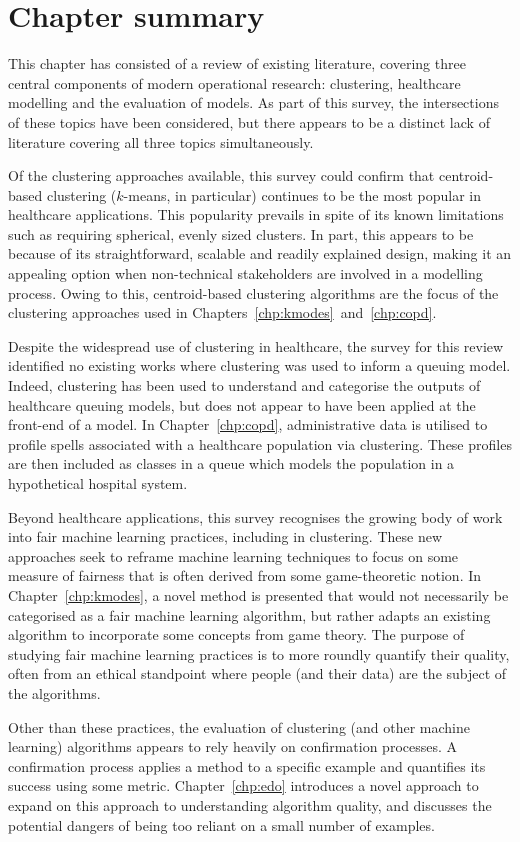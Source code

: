 \section{Chapter summary}

This chapter has consisted of a review of existing literature, covering three
central components of modern operational research: clustering, healthcare
modelling and the evaluation of models. As part of this survey, the
intersections of these topics have been considered, but there appears to be a
distinct lack of literature covering all three topics simultaneously.

Of the clustering approaches available, this survey could confirm that
centroid-based clustering (\(k\)-means, in particular) continues to be the most
popular in healthcare applications. This popularity prevails in spite of its
known limitations such as requiring spherical, evenly sized clusters. In part,
this appears to be because of its straightforward, scalable and readily
explained design, making it an appealing option when non-technical stakeholders
are involved in a modelling process. Owing to this, centroid-based clustering
algorithms are the focus of the clustering approaches used in
Chapters~\ref{chp:kmodes}~and~\ref{chp:copd}.

Despite the widespread use of clustering in healthcare, the survey for this
review identified no existing works where clustering was used to inform a
queuing model. Indeed, clustering has been used to understand and categorise the
outputs of healthcare queuing models, but does not appear to have been applied
at the front-end of a model. In Chapter~\ref{chp:copd}, administrative data is
utilised to profile spells associated with a healthcare population via
clustering. These profiles are then included as classes in a queue which models
the population in a hypothetical hospital system.

Beyond healthcare applications, this survey recognises the growing body of work
into fair machine learning practices, including in clustering. These new
approaches seek to reframe machine learning techniques to focus on some measure
of fairness that is often derived from some game-theoretic notion. In
Chapter~\ref{chp:kmodes}, a novel method is presented that would not necessarily
be categorised as a fair machine learning algorithm, but rather adapts an
existing algorithm to incorporate some concepts from game theory. The purpose of
studying fair machine learning practices is to more roundly quantify their
quality, often from an ethical standpoint where people (and their data) are the
subject of the algorithms.

Other than these practices, the evaluation of clustering (and other machine
learning) algorithms appears to rely heavily on confirmation processes. A
confirmation process applies a method to a specific example and quantifies its
success using some metric. Chapter~\ref{chp:edo} introduces a novel approach to
expand on this approach to understanding algorithm quality, and discusses the
potential dangers of being too reliant on a small number of examples.
